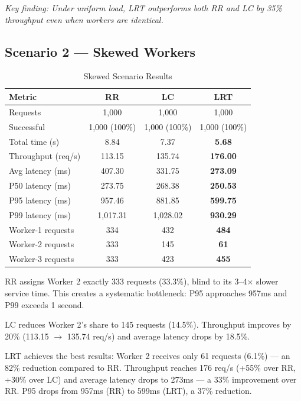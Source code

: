 \documentclass[conference]{IEEEtran}
\begin{document}
\textit{Key finding: Under uniform load, LRT outperforms both RR and LC by 35\% throughput even when workers are identical.}

\subsection{Scenario 2 --- Skewed Workers}

\begin{table}[h]
  \centering
  \caption{Skewed Scenario Results}
  \begin{tabular}{lccc}
    \toprule
    \textbf{Metric} & \textbf{RR} & \textbf{LC} & \textbf{LRT} \\
    \midrule
    Requests           & 1,000      & 1,000      & 1,000         \\
    Successful         & 1,000 (100\%) & 1,000 (100\%) & 1,000 (100\%) \\
    Total time (s)     & 8.84       & 7.37       & \textbf{5.68} \\
    Throughput (req/s) & 113.15     & 135.74     & \textbf{176.00} \\
    Avg latency (ms)   & 407.30     & 331.75     & \textbf{273.09} \\
    P50 latency (ms)   & 273.75     & 268.38     & \textbf{250.53} \\
    P95 latency (ms)   & 957.46     & 881.85     & \textbf{599.75} \\
    P99 latency (ms)   & 1,017.31   & 1,028.02   & \textbf{930.29} \\
    Worker-1 requests  & 334        & 432        & \textbf{484}  \\
    Worker-2 requests  & 333        & 145        & \textbf{61}   \\
    Worker-3 requests  & 333        & 423        & \textbf{455}  \\
    \bottomrule
  \end{tabular}
\end{table}

RR assigns Worker 2 exactly 333 requests (33.3\%), blind to its 3--4$\times$ slower service time. This creates a systematic bottleneck: P95 approaches 957ms and P99 exceeds 1 second.

LC reduces Worker 2's share to 145 requests (14.5\%). Throughput improves by 20\% (113.15 $\rightarrow$ 135.74 req/s) and average latency drops by 18.5\%.

LRT achieves the best results: Worker 2 receives only 61 requests (6.1\%) --- an 82\% reduction compared to RR. Throughput reaches 176 req/s (+55\% over RR, +30\% over LC) and average latency drops to 273ms --- a 33\% improvement over RR. P95 drops from 957ms (RR) to 599ms (LRT), a 37\% reduction.
\end{document}
